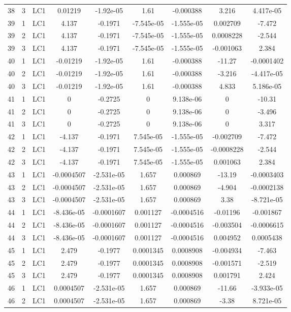 \documentclass{article}%
\begin{document}
\begin{longtable}{| c c c | c c c c c c |}
38&3&LC1&0.01219&{-}1.92e{-}05&1.61&{-}0.000388&3.216&4.417e{-}05\\%
39&1&LC1&4.137&{-}0.1971&{-}7.545e{-}05&{-}1.555e{-}05&0.002709&{-}7.472\\%
39&2&LC1&4.137&{-}0.1971&{-}7.545e{-}05&{-}1.555e{-}05&0.0008228&{-}2.544\\%
39&3&LC1&4.137&{-}0.1971&{-}7.545e{-}05&{-}1.555e{-}05&{-}0.001063&2.384\\%
40&1&LC1&{-}0.01219&{-}1.92e{-}05&1.61&{-}0.000388&{-}11.27&{-}0.0001402\\%
40&2&LC1&{-}0.01219&{-}1.92e{-}05&1.61&{-}0.000388&{-}3.216&{-}4.417e{-}05\\%
40&3&LC1&{-}0.01219&{-}1.92e{-}05&1.61&{-}0.000388&4.833&5.186e{-}05\\%
41&1&LC1&0&{-}0.2725&0&9.138e{-}06&0&{-}10.31\\%
41&2&LC1&0&{-}0.2725&0&9.138e{-}06&0&{-}3.496\\%
41&3&LC1&0&{-}0.2725&0&9.138e{-}06&0&3.317\\%
42&1&LC1&{-}4.137&{-}0.1971&7.545e{-}05&{-}1.555e{-}05&{-}0.002709&{-}7.472\\%
42&2&LC1&{-}4.137&{-}0.1971&7.545e{-}05&{-}1.555e{-}05&{-}0.0008228&{-}2.544\\%
42&3&LC1&{-}4.137&{-}0.1971&7.545e{-}05&{-}1.555e{-}05&0.001063&2.384\\%
43&1&LC1&{-}0.0004507&{-}2.531e{-}05&1.657&0.000869&{-}13.19&{-}0.0003403\\%
43&2&LC1&{-}0.0004507&{-}2.531e{-}05&1.657&0.000869&{-}4.904&{-}0.0002138\\%
43&3&LC1&{-}0.0004507&{-}2.531e{-}05&1.657&0.000869&3.38&{-}8.721e{-}05\\%
44&1&LC1&{-}8.436e{-}05&{-}0.0001607&0.001127&{-}0.0004516&{-}0.01196&{-}0.001867\\%
44&2&LC1&{-}8.436e{-}05&{-}0.0001607&0.001127&{-}0.0004516&{-}0.003504&{-}0.0006615\\%
44&3&LC1&{-}8.436e{-}05&{-}0.0001607&0.001127&{-}0.0004516&0.004952&0.0005438\\%
45&1&LC1&2.479&{-}0.1977&0.0001345&0.0008908&{-}0.004934&{-}7.463\\%
45&2&LC1&2.479&{-}0.1977&0.0001345&0.0008908&{-}0.001571&{-}2.519\\%
45&3&LC1&2.479&{-}0.1977&0.0001345&0.0008908&0.001791&2.424\\%
46&1&LC1&0.0004507&{-}2.531e{-}05&1.657&0.000869&{-}11.66&{-}3.933e{-}05\\%
46&2&LC1&0.0004507&{-}2.531e{-}05&1.657&0.000869&{-}3.38&8.721e{-}05\\%

\end{longtable}
\end{document}
